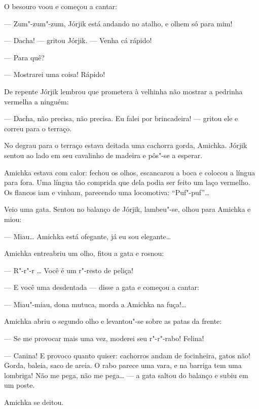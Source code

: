 O besouro voou e começou a cantar:

--- Zum"-zum"-zum, Jórjik está andando no atalho, e olhem só para mim!

--- Dacha! --- gritou Jórjik. --- Venha cá rápido!

--- Para quê?

--- Mostrarei uma coisa! Rápido!

De repente Jórjik lembrou que prometera à velhinha não mostrar a
pedrinha vermelha a ninguém:

--- Dacha, não precisa, não precisa. Eu falei por brincadeira! ---
gritou ele e correu para o terraço.

No degrau para o terraço estava deitada uma cachorra gorda, Amichka.
Jórjik sentou ao lado em seu cavalinho de madeira e pôs"-se a esperar.

Amichka estava com calor: fechou os olhos, escancarou a boca e colocou a
língua para fora. Uma língua tão comprida que dela podia ser feito um
laço vermelho. Os flancos iam e vinham, parecendo uma locomotiva:
``Puf"-puf''\ldots{}

Veio uma gata. Sentou no balanço de Jórjik, lambeu"-se, olhou para Amichka
e miou:

--- Miau\ldots{} Amichka está ofegante, já eu sou elegante\ldots{}

Amichka entreabriu um olho, fitou a gata e rosnou:

--- R"-r"-r \ldots{} Você é um r"-resto de peliça!

--- E você uma desdentada --- disse a gata e começou a cantar:

--- Miau"-miau, dona mutuca, morda a Amichka na fuça!\ldots{}

Amichka abriu o segundo olho e levantou"-se sobre as patas da frente:

--- Se me provocar mais uma vez, moderei seu r"-r"-rabo! Felina!

--- Canina! E provoco quanto quiser: cachorros andam de focinheira,
gatos não! Gorda, baleia, saco de areia. O rabo parece uma vara, e na
barriga tem uma lombriga! Não me pega, não me pega\ldots{} --- a gata saltou
do balanço e subiu em um poste.

Amichka se deitou.


